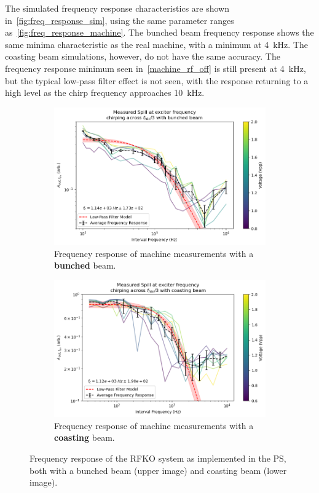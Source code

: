 \documentclass[a4paper,twoside,11pt]{report}
\begin{document}
The simulated frequency response characteristics are shown in~\autoref{fig:freq_response_sim}, using the same parameter ranges as~\autoref{fig:freq_response_machine}. The bunched beam frequency response shows the same minima characteristic as the real machine, with a minimum at \qty{4}{\kilo\hertz}. The coasting beam simulations, however, do not have the same accuracy. The frequency response minimum seen in~\autoref{machine_rf_off} is still present at \qty{4}{\kilo\hertz}, but the typical low-pass filter effect is not seen, with the response returning to a high level as the chirp frequency approaches \qty{10}{\kilo\hertz}.

\begin{figure}[h]
  \centering
  \begin{subfigure}[b]{0.9\linewidth}
    \includegraphics*[width=\linewidth]{machine_rf_on.png}
    \caption{Frequency response of machine measurements with a \textbf{bunched} beam.}\label{machine_rf_on}
  \end{subfigure}
  \begin{subfigure}[b]{0.9\linewidth}
    \includegraphics*[width=\linewidth]{machine_rf_off.png}
    \caption{Frequency response of machine measurements with a \textbf{coasting} beam.}\label{machine_rf_off}
  \end{subfigure}
  \caption[Measured RFKO frequency response]{Frequency response of the RFKO system as implemented in the PS, both with a bunched beam (upper image) and coasting beam (lower image).}\label{fig:freq_response_machine}
\end{figure}
\end{document}
